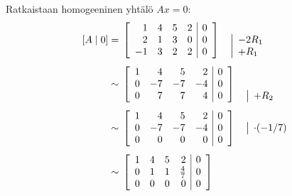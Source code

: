 \documentclass[11pt,a4paper]{amsart}
\begin{document}
\begin{solution}
  Ratkaistaan homogeeninen yhtälö \(Ax=0\):
  \[
    \begin{aligned}
      [A\mid 0] &={}
      \left[
        \begin{array}{rrrr|r}
          1 & 4 & 5 & 2 & 0 \\
          2 & 1 & 3 & 0 & 0 \\
          -1 & 3 & 2 & 2 & 0
        \end{array}
      \right]
      \quad
      \begin{array}{@{}l@{}}
        {} \\
        \smash{\rowop{-2R_1}} \\
        \smash{\rowop{+R_1}}
      \end{array}
      \\[1ex]
      &\sim{}
      \left[
        \begin{array}{rrrr|r}
          1 & 4 & 5 & 2 & 0 \\
          0 & -7 & -7 & -4 & 0 \\
          0 & 7 & 7 & 4 & 0
        \end{array}
      \right]
      \quad
      \begin{array}{@{}l@{}}
        {} \\
        {} \\
        \smash{\rowop{+R_2}}
      \end{array}
      \\[1ex]
      &\sim{}
      \left[
        \begin{array}{rrrr|r}
          1 & 4 & 5 & 2 & 0 \\
          0 & -7 & -7 & -4 & 0 \\
          0 & 0 & 0 & 0 & 0
        \end{array}
      \right]
      \quad
      \begin{array}{@{}l@{}}
        {} \\
        \smash{\rowop{\cdot(-1/7)}} \\
        {}
      \end{array}
      \\[1ex]
      &\sim{}
      \left[
        \begin{array}{rrrr|r}
          1 & 4 & 5 & 2 & 0 \\
          0 & 1 & 1 & \frac47 & 0 \\
          0 & 0 & 0 & 0 & 0
        \end{array}
      \right]
      \quad
      \begin{array}{@{}l@{}}

\end{array}
\end{aligned}\]
\end{solution}
\end{document}
